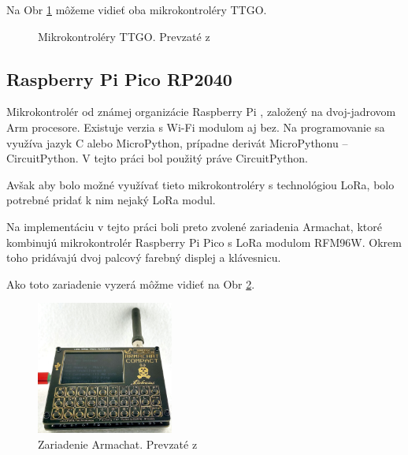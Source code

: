 \documentclass[slovak,master]{diploma}
\begin{document}
Na Obr \ref{fig:ttgo-moduly} môžeme vidieť oba mikrokontroléry TTGO.
\begin{figure}[h!]
  \centering
  \qquad
  \caption{Mikrokontroléry TTGO. Prevzaté z \cite{lilygo}}
  \label{fig:ttgo-moduly}
\end{figure}
\newpage

\subsection{Raspberry Pi Pico RP2040}
Mikrokontrolér od známej organizácie Raspberry Pi \cite{rpiOrg}, založený na dvoj-jadrovom Arm procesore. 
Existuje verzia s Wi-Fi modulom aj bez. Na programovanie sa využíva jazyk C alebo MicroPython, 
prípadne derivát MicroPythonu -- CircuitPython. V tejto práci bol použitý práve CircuitPython.

Avšak aby bolo možné využívať tieto mikrokontroléry s technológiou LoRa, bolo potrebné pridať k nim nejaký LoRa modul.

Na implementáciu v tejto práci boli preto zvolené zariadenia Armachat, ktoré kombinujú mikrokontrolér Raspberry Pi Pico s LoRa modulom RFM96W.
Okrem toho pridávajú dvoj palcový farebný displej a klávesnicu.

Ako toto zariadenie vyzerá môžme vidieť na Obr \ref{fig:armachat}.

\begin{figure}[h!]
	\centering
	\includegraphics[width=0.4\textwidth]{Figures/armachat.jpg}
	\caption{Zariadenie Armachat. Prevzaté z \cite{armachatObr}}
	\label{fig:armachat}
\end{figure}
\end{document}
